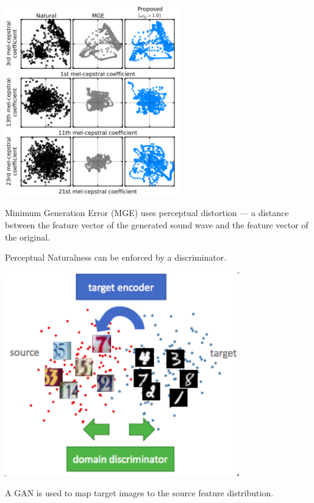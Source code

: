{\centerline{\includegraphics[width = 3.0in]{../images/Txt2spchGAN}}

\vfill
Minimum Generation Error (MGE) uses {\color{red} perceptual distortion} ---
a distance between the feature vector of the generated sound wave and the
feature vector of the original.

\vfill
{\color{red}Perceptual Naturalness} can be enforced by a discriminator.


\centerline{\includegraphics[width = 4.0in]{../images/AdvDomainAdapt}}

A GAN is used to map target images to the source feature distribution.

}
